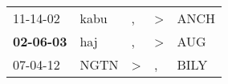 \begin{supertabular}{p{0.07\textwidth}p{0.06\textwidth}p{0.02\textwidth}p{0.02\textwidth}p{0.06\textwidth}}
          11-14-02\textsuperscript{} &  kabu\textsuperscript{} &             , &  \textgreater &  ANCH\textsuperscript{} \\
 \textbf{02-06-03\textsuperscript{}} &   haj\textsuperscript{} &             , &  \textgreater &   AUG\textsuperscript{} \\
          07-04-12\textsuperscript{} &  NGTN\textsuperscript{} &  \textgreater &             , &  BILY\textsuperscript{} \\
\end{supertabular}
